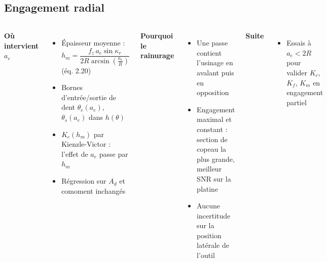 \subsection*{Engagement radial}
\begin{frame}

    \begin{columns}[t]
        \textbf{Où intervient $a_e$}
        \begin{itemize}
            \item Épaisseur moyenne : $h_m = \dfrac{f_z\, a_e \sin\kappa_r}{2R\arcsin\left(\frac{a_e}{R}\right)}$ (éq. 2.20)
            \item Bornes d'entrée/sortie de dent $\theta_e(a_e)$, $\theta_s(a_e)$ dans $h(\theta)$
            \item $K_c(h_m)$ par Kienzle-Victor : l'effet de $a_e$ passe par $h_m$
            \item Régression sur $A_d$ et comoment inchangés
        \end{itemize}
        \textbf{Pourquoi le rainurage}
        \begin{itemize}
            \item Une passe contient l'usinage \alert{en avalant puis en opposition}
            \item Engagement maximal et constant : section de copeau la plus grande, meilleur SNR sur la platine
            \item Aucune incertitude sur la position latérale de l'outil
        \end{itemize}
        \textbf{Suite}
        \begin{itemize}
            \item Essais à $a_e < 2R$ pour valider $K_c$, $K_f$, $K_m$ en engagement partiel
        \end{itemize}
    \end{columns}
\end{frame}

